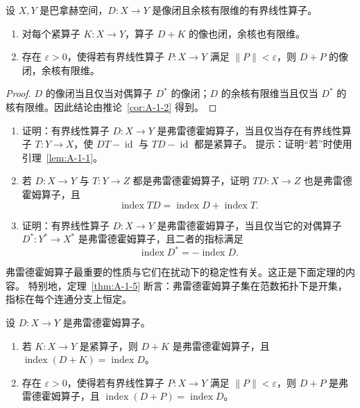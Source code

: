 \begin{corollary}\label{cor:A-1-3}
设 $X,Y$ 是巴拿赫空间，$D:X\to Y$ 是像闭且余核有限维的有界线性算子。
\begin{enumerate}[label=(\roman*)]
\item 对每个紧算子 $K:X\to Y$，算子 $D+K$ 的像也闭，余核也有限维。
\item 存在 $\varepsilon>0$，使得若有界线性算子 $P:X\to Y$ 满足
$\|P\|<\varepsilon$，则 $D+P$ 的像闭，余核有限维。
\end{enumerate}
\end{corollary}

\begin{proof}
$D$ 的像闭当且仅当对偶算子 $D^*$ 的像闭；$D$ 的余核有限维当且仅当
$D^*$ 的核有限维。因此结论由推论~\ref{cor:A-1-2} 得到。
\end{proof}

\begin{exercise}\label{ex:A-1-4}
\begin{enumerate}[label=(\roman*)]
\item 证明：有界线性算子 $D:X\to Y$ 是弗雷德霍姆算子，当且仅当存在有界线性算子
$T:Y\to X$，使 $DT-\operatorname{id}$ 与 $TD-\operatorname{id}$ 都是紧算子。
提示：证明“若”时使用引理~\ref{lem:A-1-1}。
\item 若 $D:X\to Y$ 与 $T:Y\to Z$ 都是弗雷德霍姆算子，证明
$TD:X\to Z$ 也是弗雷德霍姆算子，且
\begin{equation}\label{eq:A-1-2}
  \operatorname{index}TD=\operatorname{index}D+\operatorname{index}T.
\end{equation}
\item 证明：有界线性算子 $D:X\to Y$ 是弗雷德霍姆算子，当且仅当它的对偶算子
$D^*:Y^*\to X^*$ 是弗雷德霍姆算子，且二者的指标满足
\[
  \operatorname{index}D^*=-\operatorname{index}D.
\]
\end{enumerate}
\end{exercise}

弗雷德霍姆算子最重要的性质与它们在扰动下的稳定性有关。这正是下面定理的内容。
特别地，定理~\ref{thm:A-1-5} 断言：弗雷德霍姆算子集在范数拓扑下是开集，
指标在每个连通分支上恒定。

\begin{theorem}\label{thm:A-1-5}
设 $D:X\to Y$ 是弗雷德霍姆算子。
\begin{enumerate}[label=(\roman*)]
\item 若 $K:X\to Y$ 是紧算子，则 $D+K$ 是弗雷德霍姆算子，且
$\operatorname{index}(D+K)=\operatorname{index}D$。
\item 存在 $\varepsilon>0$，使得若有界线性算子 $P:X\to Y$ 满足
$\|P\|<\varepsilon$，则 $D+P$ 是弗雷德霍姆算子，且
$\operatorname{index}(D+P)=\operatorname{index}D$。
\end{enumerate}
\end{theorem}

